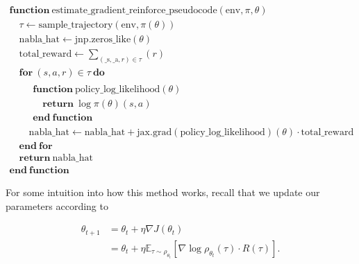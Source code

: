 \documentclass[
  letterpaper,
  DIV=11,
  numbers=noendperiod]{scrreprt}
\theoremstyle{plain}
\theoremstyle{plain}
\theoremstyle{definition}
\theoremstyle{definition}
\theoremstyle{remark}
\begin{document}
$ \begin{array}{l} \mathbf{function} \ \mathrm{estimate\_gradient\_reinforce\_pseudocode}(\mathrm{env}, \pi, \theta) \\ \hspace{1em} \tau \gets \mathrm{sample\_trajectory} \mathopen{}\left( \mathrm{env}, \pi \mathopen{}\left( \theta \mathclose{}\right) \mathclose{}\right) \\ \hspace{1em} \mathrm{nabla\_hat} \gets \mathrm{jnp}.\mathrm{zeros\_like} \mathopen{}\left( \theta \mathclose{}\right) \\ \hspace{1em} \mathrm{total\_reward} \gets \sum_{\mathopen{}\left( \mathrm{\_s}, \mathrm{\_a}, r \mathclose{}\right) \in \tau}^{} \mathopen{}\left({r}\mathclose{}\right) \\ \hspace{1em} \mathbf{for} \ \mathopen{}\left( s, a, r \mathclose{}\right) \in \tau \ \mathbf{do} \\ \begin{array}{l} \hspace{2em} \mathbf{function} \ \mathrm{policy\_log\_likelihood}(\theta) \\ \hspace{3em} \mathbf{return} \ \log \pi \mathopen{}\left( \theta \mathclose{}\right) \mathopen{}\left( s, a \mathclose{}\right) \\ \hspace{2em} \mathbf{end \ function} \end{array} \\ \hspace{2em} \mathrm{nabla\_hat} \gets \mathrm{nabla\_hat} + \mathrm{jax}.\mathrm{grad} \mathopen{}\left( \mathrm{policy\_log\_likelihood} \mathclose{}\right) \mathopen{}\left( \theta \mathclose{}\right) \cdot \mathrm{total\_reward} \\ \hspace{1em} \mathbf{end \ for} \\ \hspace{1em} \mathbf{return} \ \mathrm{nabla\_hat} \\ \mathbf{end \ function} \end{array} $

For some intuition into how this method works, recall that we update our
parameters according to

\[
\begin{aligned}
    \theta_{t+1} &= \theta_t + \eta \nabla J(\theta_t) \\
    &= \theta_t + \eta \mathbb{E}_{\tau \sim \rho_{\theta_t}} [\nabla \log \rho_{\theta_t}(\tau) \cdot R(\tau)].
\end{aligned}
\]
\end{document}
